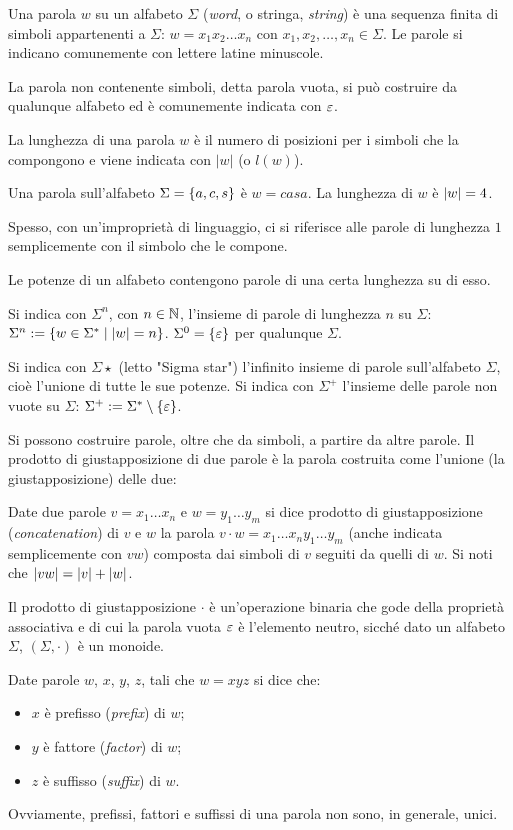 \begin{defin}[parola]
	Una parola $w$ su un alfabeto $\Sigma$ (\emph{word}, o stringa, \emph{string}) è una sequenza finita di simboli appartenenti a $\Sigma$: $w=x_1 x_2 \dots x_n$ con $x_1,x_2,\dots,x_n\in\Sigma$. Le parole si indicano comunemente con lettere latine minuscole.

	La parola non contenente simboli, detta parola vuota, si può costruire da qualunque alfabeto ed è comunemente indicata con $\varepsilon$.

	La lunghezza di una parola $w$ è il numero di posizioni per i simboli che la compongono e viene indicata con $|w|$ (o $l(w)$).
\end{defin}
\begin{examp}
	Una parola sull'alfabeto $\Sigma=\left\{ a,c,s \right\}$ è $w=casa$. La lunghezza di $w$ è $|w|=4$.
\end{examp}
Spesso, con un'improprietà di linguaggio, ci si riferisce alle parole di lunghezza $1$ semplicemente con il simbolo che le compone.

Le potenze di un alfabeto contengono parole di una certa lunghezza su di esso.
\begin{defin}
	Si indica con $\Sigma^n$, con $n\in\mathbb N$, l'insieme di parole di lunghezza $n$ su $\Sigma$: $\Sigma^n := \left\{ w\in\Sigma^*\mid |w|=n \right\}$. $\Sigma^0=\left\{ \varepsilon \right\}$ per qualunque $\Sigma$.

	Si indica con $\Sigma\star$ (letto "Sigma star") l'infinito insieme di parole sull'alfabeto $\Sigma$, cioè l'unione di tutte le sue potenze. Si indica con $\Sigma^+$ l'insieme delle parole non vuote su $\Sigma$: $\Sigma^+ := \Sigma^*\setminus\left\{ \varepsilon \right\}$.
\end{defin}

Si possono costruire parole, oltre che da simboli, a partire da altre parole. Il prodotto di giustapposizione di due parole è la parola costruita come l'unione (la giustapposizione) delle due:
\begin{defin}
	Date due parole $v=x_1\dots x_n$ e $w=y_1\dots y_m$ si dice prodotto di giustapposizione (\emph{concatenation}) di $v$ e $w$ la parola $v\cdot w=x_1\dots x_n y_1\dots y_m$ (anche indicata semplicemente con $vw$) composta dai simboli di $v$ seguiti da quelli di $w$. Si noti che $|vw|=|v|+|w|$.
\end{defin}
Il prodotto di giustapposizione $\cdot$ è un'operazione binaria che gode della proprietà associativa e di cui la parola vuota $\varepsilon$ è l'elemento neutro, sicché dato un alfabeto $\Sigma$, $(\Sigma,\cdot)$ è un monoide.
\begin{defin}
	Date parole $w$, $x$, $y$, $z$, tali che $w=xyz$ si dice che:
	\begin{itemize}
		\item $x$ è prefisso (\emph{prefix}) di $w$;
		\item $y$ è fattore (\emph{factor}) di $w$;
		\item $z$ è suffisso (\emph{suffix}) di $w$.
	\end{itemize}
\end{defin}
Ovviamente, prefissi, fattori e suffissi di una parola non sono, in generale, unici.


